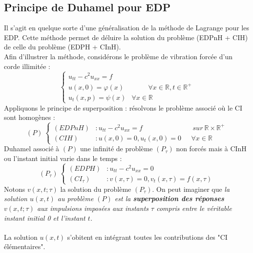 \documentclass[11pt, a4paper, openany]{book}
\begin{document}
																
																
			\subsection{Principe de Duhamel pour EDP}
			Il s'agit en quelque sorte d'une généralisation de la méthode de Lagrange pour les EDP. Cette méthode permet de déluire la solution du problème (EDPnH + CIH) de celle du problème (EDPH + CInH).\\
			Afin d'illustrer la méthode, considérons le problème de vibration forcée d'un corde illimitée :
			\begin{equation}
				\left\{\begin{array}{lr}
				u_{tt} - c^2u_{xx} = f\\
				u(x,0) = \varphi(x)&\ \ \ \ \ \ \ \ \ \ \ \forall x\in \mathbb{R}, t\in \mathbb{R}^+\\
				u_t(x,p) = \psi(x) & \forall x \in \mathbb{R}
				\end{array}\right.
			\end{equation}
			Appliquons le principe de superposition : résolvons le problème associé où le CI sont homogènes :
			\begin{equation}
				(P)\ \left\{\begin{array}{llr}
				(EDPnH) &: u_{tt} - c^2u_{xx} = f&\ \ \ \ sur\ \mathbb{R}\times\mathbb{R}^+\\
				(CIH) &: u(x,0) = 0, u_t(x,0) = 0 &\ \ \ \forall x \in \mathbb{R}
				\end{array}\right.
			\end{equation}
			Duhamel associé à $(P)$ une infinité de problème $(P_\tau)$ non forcés mais à CInH ou l'instant initial varie dans le temps :
			\begin{equation}
				(P_\tau)\ \left\{\begin{array}{ll}
				(EDPH) &: u_{tt} - c^2u_{xx} = 0\\
				(CI_\tau) &: v(x,\tau) = 0, v_t(x,\tau) = f(x,\tau)
				\end{array}\right.
			\end{equation}
			Notons $v(x,t;\tau)$ la solution du problème $(P_\tau)$. On peut imaginer que \textit{la solution $u(x,t)$ au problème $(P)$ est la \textbf{superposition des réponses $v(x,t;\tau)$} aux impulsions imposées aux instants $\tau$ compris entre le véritable instant initial 0 et l'instant $t$.}\ \\
																
			\ \\
			La solution $u(x,t)$ s'obitent en intégrant toutes les contributions des "CI élémentaires".
																
\end{document}

